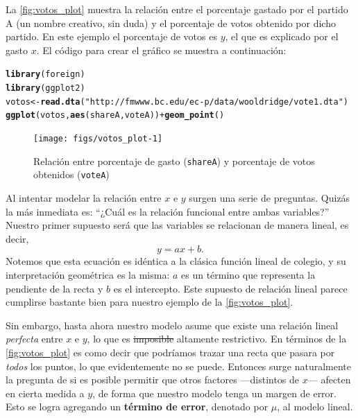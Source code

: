 \documentclass{report}\usepackage[]{graphicx}\usepackage[]{color}
\makeatletter
\newcommand{\hlstr}[1]{\textcolor[rgb]{0.192,0.494,0.8}{#1}}%
\newcommand{\hlopt}[1]{\textcolor[rgb]{0,0,0}{#1}}%
\newcommand{\hlstd}[1]{\textcolor[rgb]{0.345,0.345,0.345}{#1}}%
\newcommand{\hlkwb}[1]{\textcolor[rgb]{0.69,0.353,0.396}{#1}}%
\newcommand{\hlkwd}[1]{\textcolor[rgb]{0.737,0.353,0.396}{\textbf{#1}}}%
\newenvironment{kframe}{%
 \def\at@end@of@kframe{}%
 \ifinner\ifhmode%
  \def\at@end@of@kframe{\end{minipage}}%
  \begin{minipage}{\columnwidth}%
 \fi\fi%
 \def\FrameCommand##1{\hskip\@totalleftmargin \hskip-\fboxsep
 \colorbox{shadecolor}{##1}\hskip-\fboxsep
     \hskip-\linewidth \hskip-\@totalleftmargin \hskip\columnwidth}%
 \MakeFramed {\advance\hsize-\width
   \@totalleftmargin\z@ \linewidth\hsize
   \@setminipage}}%
 {\par\unskip\endMakeFramed%
 \at@end@of@kframe}
\newenvironment{knitrout}{}{} %
\newcommand*{\kw}[1]{\textbf{#1}\index{#1}}
\makeatother
\begin{document}
La \autoref{fig:votos_plot} muestra la relación entre el porcentaje gastado por el partido A (un nombre creativo, sin duda) y el porcentaje de votos obtenido por dicho partido.
En este ejemplo el porcentaje de votos es $y$, el que es explicado por el gasto $x$.
El código para crear el gráfico se muestra a continuación:
\begin{knitrout}
\color{fgcolor}\begin{kframe}
\begin{alltt}
\hlkwd{library}\hlstd{(foreign)}
\hlkwd{library}\hlstd{(ggplot2)}
\hlstd{votos} \hlkwb{<-} \hlkwd{read.dta}\hlstd{(}\hlstr{"http://fmwww.bc.edu/ec-p/data/wooldridge/vote1.dta"}\hlstd{)}
\hlkwd{ggplot}\hlstd{(votos,} \hlkwd{aes}\hlstd{(shareA, voteA))} \hlopt{+} \hlkwd{geom_point}\hlstd{()}
\end{alltt}
\end{kframe}\begin{figure}

{\centering \texttt{[image: figs/votos\_plot-1]} 

}

\caption[Relación entre porcentaje de gasto (\texttt{shareA}) y porcentaje de votos obtenidos (\texttt{voteA})]{Relación entre porcentaje de gasto (\texttt{shareA}) y porcentaje de votos obtenidos (\texttt{voteA})}\label{fig:votos_plot}
\end{figure}


\end{knitrout}



Al intentar modelar la relación entre $x$ e $y$ surgen una serie de preguntas. Quizás la más inmediata es: ``¿Cuál es la relación funcional entre ambas variables?''
Nuestro primer supuesto será que las variables se relacionan de manera lineal, es decir,
\begin{equation*}
y = ax + b.
\end{equation*}
Notemos que esta ecuación es idéntica a la clásica función lineal de colegio, y su interpretación geométrica es la misma: $a$ es un término que representa la pendiente de la recta y $b$ es el intercepto.
Este supuesto de relación lineal parece cumplirse bastante bien para nuestro ejemplo de la \autoref{fig:votos_plot}.

Sin embargo, hasta ahora nuestro modelo asume que existe una relación lineal \emph{perfecta} entre $x$ e $y$, lo que es \sout{imposible} altamente restrictivo. 
En términos de la \autoref{fig:votos_plot} es como decir que podríamos trazar una recta que pasara por \emph{todos} los puntos, lo que evidentemente no se puede.
Entonces surge naturalmente la pregunta de si es posible permitir que otros factores ---distintos de $x$--- afecten en cierta medida a $y$, de forma que nuestro modelo tenga un margen de error.
Esto se logra agregando un \kw{término de error}, denotado por $\mu$, al modelo lineal.
\end{document}
